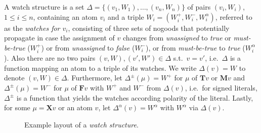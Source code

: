 \documentclass{vutinfth} %
\theoremstyle{example}
\theoremstyle{definition}
\theoremstyle{theorem}
\theoremstyle{lemma}
\theoremstyle{corollary}
\newcommand{\mbt}{must-be-true}
\newcommand{\bT}{\mathbf{T}}
\newcommand{\bM}{\mathbf{M}}
\newcommand{\bF}{\mathbf{F}}
\newcommand{\bX}{\mathbf{X}}
\newcommand{\sgl}{\mu}
\begin{document}

A watch structure is a set $\Delta = \{ (v_1, W_1), \ldots, (v_n, W_n) \}$ of pairs $(v_i, W_i)$, $1 \leq i \leq n$, containing an atom $v_i$ and a triple $W_i = (W_i^+, W_i^-, W_i^\alpha)$, referred to as the \emph{watches for $v_i$}, consisting of three sets of nogoods that potentially propagate in case the assignment of $v$ changes from \emph{unassigned} to \emph{true} or \emph{\mbt} ($W_i^+$) or from \emph{unassigned} to \emph{false} ($W_i^-$), or from \emph{\mbt} to \emph{true} ($W_i^\alpha$). Also there are no two pairs $(v, W), (v', W') \in \Delta$ s.t.~$v = v'$, i.e.~$\Delta$ is a function mapping an atom to a triple of its watches. We write $\Delta(v) = W$ to denote $(v, W) \in \Delta$. Furthermore, let $\Delta^\pm(\sgl) = W^+$ for $\sgl$ of $\bT v$ or $\bM v$ and $\Delta^\pm(\sgl) = W^-$ for $\sgl$ of $\bF v$ with $W^+$ and $W^-$ from $\Delta(v)$, i.e.~for signed literals, $\Delta^\pm$ is a function that yields the watches according polarity of the literal. Lastly, for some $\sgl = \bX v$ or an atom $v$, let $\Delta^\alpha(v) = W^\alpha$ with $W^\alpha$ via $\Delta(v)$.

\begin{figure}[h]
  \centering
{}
  \caption{Example layout of a \emph{watch structure}.}
  \label{fig:watches} %
\end{figure}
\end{document}
